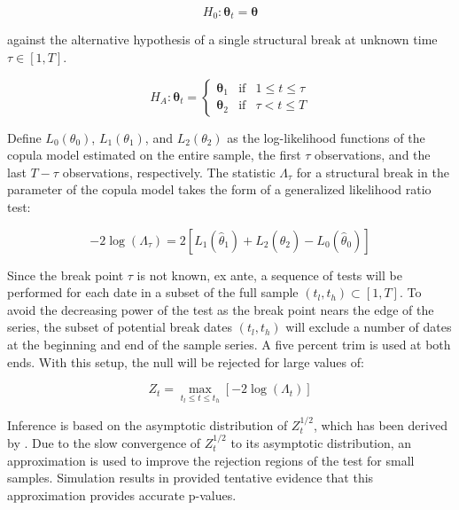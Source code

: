 \documentclass[12pt]{article}
\begin{document}
\begin{equation}
	H_{0}:\boldsymbol{\theta}_{t} = \boldsymbol{\theta}
\end{equation}

against the alternative hypothesis of a single structural break at unknown time $\tau \in \left[1, T\right]$.

\begin{equation}
H_{A}:\boldsymbol{\theta}_{t} = \left\{
\begin{array}{ccc}
    \boldsymbol{\theta}_{1} & \text{if} & 1\leq t \leq \tau \\ 
    \boldsymbol{\theta}_{2} & \text{if} & \tau < t \leq T
\end{array}
\right. 
\end{equation}

Define $L_{0}\left(\theta_{0}\right)$, $L_{1}\left(\theta_{1}\right)$, and $L_{2}\left(\theta_{2}\right)$ as the log-likelihood functions of the copula model estimated on the entire sample, the first $\tau$ observations, and the last $T-\tau$ observations, respectively. The statistic $\Lambda_{\tau}$ for a structural break in the parameter of the copula model takes the form of a generalized likelihood ratio test:

\begin{equation}
	-2\log \left(\Lambda_{\tau}\right) = 2\left[L_{1}\left(\hat{\theta}_{1}\right) + L_{2}\left(\hat{\theta}_{2}\right) - L_{0}\left(\hat{\theta}_{0}\right)\right]
\end{equation}

Since the break point $\tau$ is not known, ex ante, a sequence of tests will be performed for each date in a subset of the full sample $\left(t_{l},t_{h}\right) \subset \left[1, T\right]$. To avoid the decreasing power of the test as the break point nears the edge of the series, the subset of potential break dates $\left( t_{l},t_{h}\right)$ will exclude a number of dates at the beginning and end of the sample series. A five percent trim is used at both ends. With this setup, the null will be rejected for large values of:

\begin{equation}
	Z_{t}=\max_{t_{l}\leq t\leq t_{h}}\left[ -2\log \left( \Lambda _{t}\right)\right]
\end{equation}

Inference is based on the asymptotic distribution of $Z_{t}^{1/2}$, which has been derived by \cite{Csorgo_and_Horvath_1997}. Due to the slow convergence of $Z_{t}^{1/2}$ to its asymptotic distribution, an approximation is used to improve the rejection regions of the test for small samples. Simulation results in \cite{Dias_and_Embrechts_2004} provided tentative evidence that this approximation provides accurate p-values.
\end{document}
